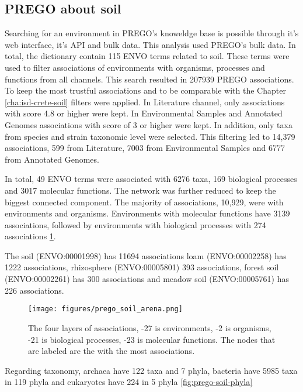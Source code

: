    \subsection{PREGO about soil}
   \label{subsec:prego-soil}

Searching for an environment in PREGO's knoweldge base is possible through
it's web interface, it's API and bulk data. This analysis used PREGO's bulk data. 
In total, the dictionary contain 115 ENVO terms related to soil. These terms were
used to filter associations of environments with organisms, processes and functions 
from all channels. This search resulted in 207939 PREGO associations. 
To keep the most trustful associations and to be comparable with the Chapter \ref{cha:isd-crete-soil}
filters were applied. In Literature channel, only associations with score 4.8 or higher were kept. 
In Environmental Samples and Annotated Genomes associations with score of 3 or higher were kept. 
In addition, only taxa from species and strain taxonomic level were selected.
This filtering led to 14,379 associations, 599 from Literature, 7003 from Environmental
Samples and 6777 from Annotated Genomes.

In total, 49 ENVO terms were associated with 6276 taxa, 169 biological processes
and 3017 molecular functions. The network was further reduced to keep the 
biggest connected component. 
The majority of associations, 10,929, were with environments and organisms.
Environments with molecular functions have 3139 associations, followed by 
environments with biological processes with 274 associations \ref{fig:prego-soil-network}.

The soil (ENVO:00001998) has 11694 associations
loam (ENVO:00002258) has 1222 associations,
rhizosphere (ENVO:00005801) 393 associations,
forest soil (ENVO:00002261) has 300 associations and
meadow soil (ENVO:00005761) has 226 associations.

   \begin{figure}[hbt!]
      \centering
      \texttt{[image: figures/prego\_soil\_arena.png]}
      \caption[PREGO soil network]{
         The four layers of associations, -27 is environments, -2 is organisms, -21 is biological processes, -23 is molecular functions. The nodes that are labeled are the with the most associations.}
      \label{fig:prego-soil-network}
   \end{figure}

Regarding taxonomy, archaea have 122 taxa and 7 phyla, bacteria have 5985 taxa
in 119 phyla and eukaryotes have 224 in 5 phyla \ref{fig:prego-soil-phyla}

